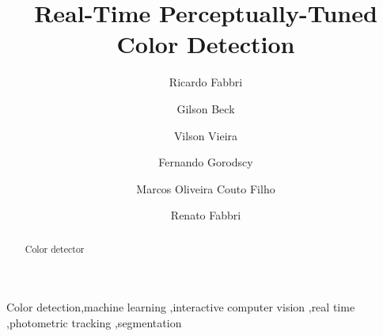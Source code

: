 \begin{frontmatter}

\title{Real-Time Perceptually-Tuned Color Detection} 



\author[iprj,aa]{Ricardo Fabbri}


\author[aa]{Gilson Beck}

\author[ifsc,aa]{Vilson Vieira}

\author[icmc,aa]{Fernando Gorodscy}

\author[iprj]{Marcos Oliveira Couto Filho}

\author[ifsc,aa]{Renato Fabbri}

\address[iprj]{Instituto Polit\'{e}cnico, Universidade do Estado do Rio de
Janeiro\\C.P.: 97282 - 28601-970 - Nova Friburgo, RJ, Brazil}

\address[ifsc]{Instituto de F\'{i}sica de S\~{a}o Carlos (IFSC), Universidade de
S\~{a}o Paulo (USP)\\ Av.  Trabalhador S\~{a}o Carlense, 400,
13560-970 - S\~{a}o Carlos, SP, Brazil}

\address[icmc]{Instituto de Ci\^{e}ncias Matem\'{a}ticas e de
Computa\c{c}\~{a}o (ICMC), Universidade de
S\~{a}o Paulo (USP)\\ Av.  Trabalhador S\~{a}o Carlense, 400,
13560-970 - S\~{a}o Carlos, SP, Brazil}

\address[aa] {LabMacambira.sourceforge.net distributed hacker group}




\begin{abstract}
Color detector 
\end{abstract}

\begin{keyword}
Color detection\sep machine learning \sep interactive
computer vision \sep real time \sep photometric tracking \sep segmentation
\end{keyword}

\end{frontmatter}
